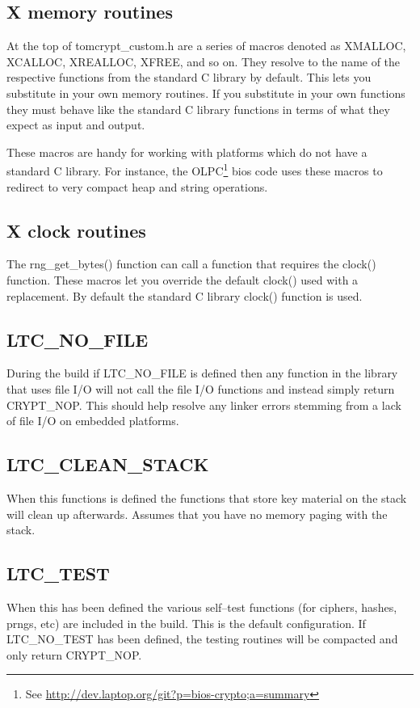 \documentclass[synpaper]{book}
\begin{document}
\subsection{X memory routines}
At the top of tomcrypt\_custom.h are a series of macros denoted as XMALLOC, XCALLOC, XREALLOC, XFREE, and so on.  They resolve to
the name of the respective functions from the standard C library by default.  This lets you substitute in your own memory routines.
If you substitute in your own functions they must behave like the standard C library functions in terms of what they expect as input and
output.

These macros are handy for working with platforms which do not have a standard C library.
For instance, the OLPC\footnote{See \url{http://dev.laptop.org/git?p=bios-crypto;a=summary}}
bios code uses these macros to redirect to very compact heap and string operations.

\subsection{X clock routines}
The rng\_get\_bytes() function can call a function that requires the clock() function.  These macros let you override
the default clock() used with a replacement.  By default the standard C library clock() function is used.

\subsection{LTC\_NO\_FILE}
During the build if LTC\_NO\_FILE is defined then any function in the library that uses file I/O will not call the file I/O
functions and instead simply return CRYPT\_NOP.  This should help resolve any linker errors stemming from a lack of
file I/O on embedded platforms.

\subsection{LTC\_CLEAN\_STACK}
When this functions is defined the functions that store key material on the stack will clean up afterwards.
Assumes that you have no memory paging with the stack.

\subsection{LTC\_TEST}
When this has been defined the various self--test functions (for ciphers, hashes, prngs, etc) are included in the build.  This is the default configuration.
If LTC\_NO\_TEST has been defined, the testing routines will be compacted and only return CRYPT\_NOP.
\end{document}
